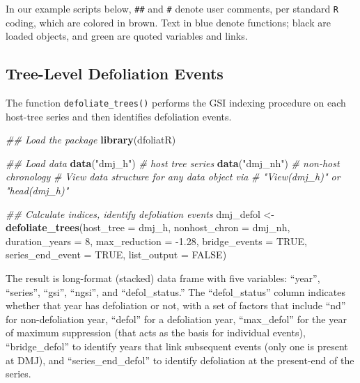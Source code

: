 \documentclass[review]{elsarticle} %
\newenvironment{Shaded}{\begin{snugshade}}{\end{snugshade}}
\newcommand{\CommentTok}[1]{\textcolor[rgb]{0.56,0.35,0.01}{\textit{#1}}}
\newcommand{\DataTypeTok}[1]{\textcolor[rgb]{0.13,0.29,0.53}{#1}}
\newcommand{\DecValTok}[1]{\textcolor[rgb]{0.00,0.00,0.81}{#1}}
\newcommand{\FloatTok}[1]{\textcolor[rgb]{0.00,0.00,0.81}{#1}}
\newcommand{\KeywordTok}[1]{\textcolor[rgb]{0.13,0.29,0.53}{\textbf{#1}}}
\newcommand{\NormalTok}[1]{#1}
\newcommand{\OtherTok}[1]{\textcolor[rgb]{0.56,0.35,0.01}{#1}}
\newcommand{\StringTok}[1]{\textcolor[rgb]{0.31,0.60,0.02}{#1}}
\begin{document}
In our example scripts below, \texttt{\#\#} and \texttt{\#} denote user comments, per standard \texttt{R} coding, which are colored in brown. Text in blue denote functions; black are loaded objects, and green are quoted variables and links.

\hypertarget{tree-level-defoliation-events}{%
\subsection{Tree-Level Defoliation Events}\label{tree-level-defoliation-events}}

The function \texttt{defoliate\_trees()} performs the GSI indexing procedure on each host-tree series and then identifies defoliation events.

\begin{Shaded}
\begin{Highlighting}[]
\CommentTok{## Load the package}
\KeywordTok{library}\NormalTok{(dfoliatR)}

\CommentTok{## Load data}
\KeywordTok{data}\NormalTok{(}\StringTok{"dmj_h"}\NormalTok{) }\CommentTok{# host tree series}
\KeywordTok{data}\NormalTok{(}\StringTok{"dmj_nh"}\NormalTok{) }\CommentTok{# non-host chronology}
\CommentTok{# View data structure for any data object via }
\CommentTok{# "View(dmj_h)" or "head(dmj_h)"}

\CommentTok{## Calculate indices, identify defoliation events}
\NormalTok{dmj_defol <-}\StringTok{ }\KeywordTok{defoliate_trees}\NormalTok{(}\DataTypeTok{host_tree =}\NormalTok{ dmj_h,}
                             \DataTypeTok{nonhost_chron =}\NormalTok{ dmj_nh,}
                             \DataTypeTok{duration_years =} \DecValTok{8}\NormalTok{,  }
                             \DataTypeTok{max_reduction =} \FloatTok{-1.28}\NormalTok{, }
                             \DataTypeTok{bridge_events =} \OtherTok{TRUE}\NormalTok{, }
                             \DataTypeTok{series_end_event =} \OtherTok{TRUE}\NormalTok{, }
                             \DataTypeTok{list_output =} \OtherTok{FALSE}\NormalTok{) }
\end{Highlighting}
\end{Shaded}

The result is long-format (stacked) data frame with five variables: ``year'', ``series'', ``gsi'', ``ngsi'', and ``defol\_status.'' The ``defol\_status'' column indicates whether that year has defoliation or not, with a set of factors that include ``nd'' for non-defoliation year, ``defol'' for a defoliation year, ``max\_defol'' for the year of maximum suppression (that acts as the basis for individual events), ``bridge\_defol'' to identify years that link subsequent events (only one is present at DMJ), and ``series\_end\_defol'' to identify defoliation at the present-end of the series.
\end{document}
